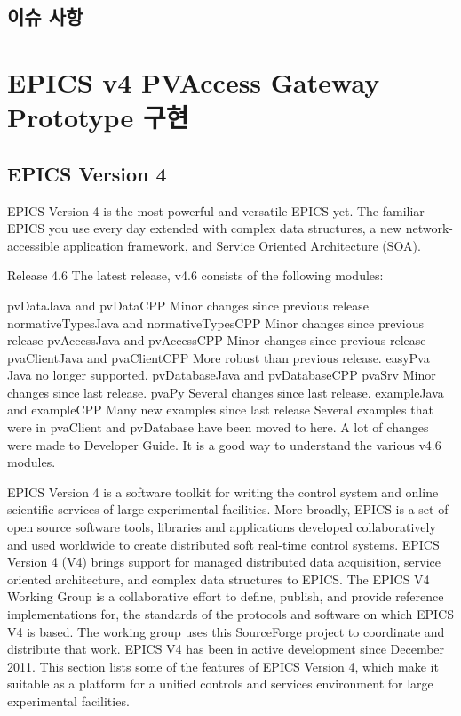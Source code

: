 \documentclass[11pt
  , a4paper
  , article
  , oneside
]{memoir}
\begin{document}
\section{이슈 사항}

\hfil\break

\chapter{EPICS v4 PVAccess Gateway Prototype 구현}
\section{EPICS Version 4}
EPICS Version 4 is the most powerful and versatile EPICS yet. The familiar EPICS you use every day extended with complex data structures, a new network-accessible application framework, and Service Oriented Architecture (SOA).

Release 4.6
The latest release, v4.6 consists of the following modules:

pvDataJava and pvDataCPP
Minor changes since previous release
normativeTypesJava and normativeTypesCPP
Minor changes since previous release
pvAccessJava and pvAccessCPP
Minor changes since previous release
pvaClientJava and pvaClientCPP
More robust than previous release.
easyPva Java no longer supported.
pvDatabaseJava and pvDatabaseCPP
pvaSrv
Minor changes since last release.
pvaPy
Several changes since last release.
exampleJava and exampleCPP
Many new examples since last release
Several examples that were in pvaClient and pvDatabase have been moved to here.
A lot of changes were made to Developer Guide. It is a good way to understand the various v4.6 modules.

EPICS Version 4 is a software toolkit for writing the control system and online scientific services of large experimental facilities. More broadly, EPICS is a set of open source software tools, libraries and applications developed collaboratively and used worldwide to create distributed soft real-time control systems. EPICS Version 4 (V4) brings support for managed distributed data acquisition, service oriented architecture, and complex data structures to EPICS. The EPICS V4 Working Group is a collaborative effort to define, publish, and provide reference implementations for, the standards of the protocols and software on which EPICS V4 is based. The working group uses this SourceForge project to coordinate and distribute that work. EPICS V4 has been in active development since December 2011.
This section lists some of the features of EPICS Version 4, which make it suitable as a platform for a unified controls and services environment for large experimental facilities.
\end{document}
